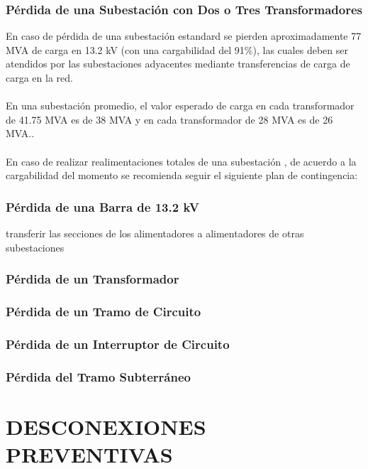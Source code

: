 \documentclass[a5paper]{book}%
\begin{document}
\subsubsection{Pérdida de una Subestación con Dos o Tres Transformadores}

En caso de pérdida de una subestación estandard se pierden
aproximadamente 77 MVA de carga en 13.2 kV (con una cargabilidad del 91\%), las cuales deben ser atendidos por las subestaciones adyacentes mediante transferencias de carga  de carga en la red.\\\\
 En una subestación promedio, el valor esperado de carga en cada transformador de 41.75 MVA es de 38 MVA y en cada transformador de 28 MVA es de 26 MVA.\cite{EMCALI2007}.\\\\

En caso de realizar realimentaciones totales de una subestación , de acuerdo a la cargabilidad del momento se recomienda seguir el siguiente plan de contingencia:

\subsubsection{Pérdida de una Barra de 13.2 kV}

 transferir las secciones de los alimentadores a alimentadores de otras
subestaciones

\subsubsection{Pérdida de un Transformador}

\subsubsection{Pérdida de un Tramo de Circuito}

\subsubsection{Pérdida de un Interruptor de Circuito}

\subsubsection{Pérdida del Tramo Subterráneo}

\section{DESCONEXIONES PREVENTIVAS}
\end{document}

